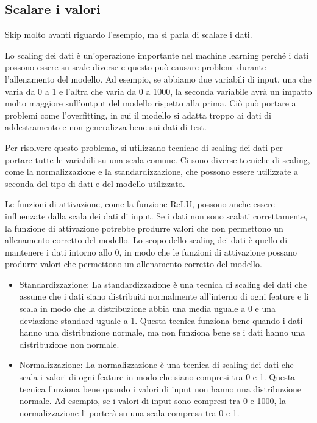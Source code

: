 \subsection{Scalare i valori}

Skip molto avanti riguardo l'esempio, ma si parla di scalare i dati.

Lo scaling dei dati è un'operazione importante nel machine learning perché i
dati possono essere su scale diverse e questo può causare problemi durante
l'allenamento del modello. Ad esempio, se abbiamo due variabili di input, una
che varia da 0 a 1 e l'altra che varia da 0 a 1000, la seconda variabile avrà
un impatto molto maggiore sull'output del modello rispetto alla prima. Ciò può
portare a problemi come l'overfitting, in cui il modello si adatta troppo ai
dati di addestramento e non generalizza bene sui dati di test.

Per risolvere questo problema, si utilizzano tecniche di scaling dei dati per
portare tutte le variabili su una scala comune. Ci sono diverse tecniche di
scaling, come la normalizzazione e la standardizzazione, che possono essere
utilizzate a seconda del tipo di dati e del modello utilizzato.

Le funzioni di attivazione, come la funzione ReLU, possono anche essere
influenzate dalla scala dei dati di input. Se i dati non sono scalati
correttamente, la funzione di attivazione potrebbe produrre valori che non
permettono un allenamento corretto del modello. Lo scopo dello scaling dei dati
è quello di mantenere i dati intorno allo 0, in modo che le funzioni di
attivazione possano produrre valori che permettono un allenamento corretto del
modello.

\begin{itemize}
    \item Standardizzazione: La standardizzazione è una tecnica di scaling dei dati che
          assume che i dati siano distribuiti normalmente all'interno di ogni feature e
          li scala in modo che la distribuzione abbia una media uguale a 0 e una
          deviazione standard uguale a 1. Questa tecnica funziona bene quando i dati
          hanno una distribuzione normale, ma non funziona bene se i dati hanno una
          distribuzione non normale.
    \item Normalizzazione: La normalizzazione è una tecnica di scaling dei dati che scala
          i valori di ogni feature in modo che siano compresi tra 0 e 1. Questa tecnica
          funziona bene quando i valori di input non hanno una distribuzione normale. Ad
          esempio, se i valori di input sono compresi tra 0 e 1000, la normalizzazione li
          porterà su una scala compresa tra 0 e 1.
\end{itemize}

